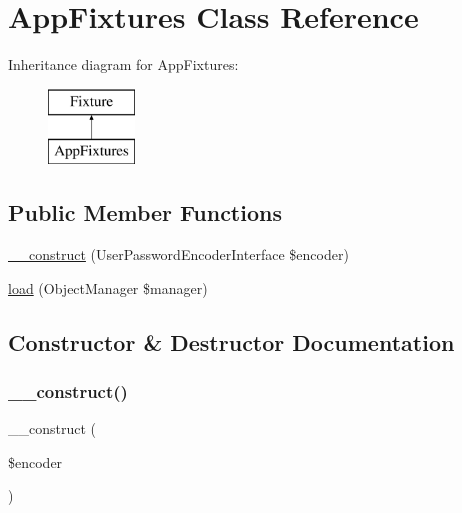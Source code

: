 \hypertarget{class_app_1_1_data_fixtures_1_1_app_fixtures}{}\section{App\+Fixtures Class Reference}
\label{class_app_1_1_data_fixtures_1_1_app_fixtures}
Inheritance diagram for App\+Fixtures\+:\begin{figure}[H]
\begin{center}
\leavevmode
\includegraphics[height=2.000000cm]{class_app_1_1_data_fixtures_1_1_app_fixtures}
\end{center}
\end{figure}
\subsection*{Public Member Functions}
\begin{DoxyCompactItemize}
\item 
\mbox{\hyperlink{class_app_1_1_data_fixtures_1_1_app_fixtures_ad2b145f3d6cc187491f7b61452daa8cf}{\+\_\+\+\_\+construct}} (User\+Password\+Encoder\+Interface \$encoder)
\item 
\mbox{\hyperlink{class_app_1_1_data_fixtures_1_1_app_fixtures_acb7929747e63056fbc9e2892615c18b2}{load}} (Object\+Manager \$manager)
\end{DoxyCompactItemize}


\subsection{Constructor \& Destructor Documentation}
\mbox{\label{class_app_1_1_data_fixtures_1_1_app_fixtures_ad2b145f3d6cc187491f7b61452daa8cf}} 
\subsubsection{\texorpdfstring{\_\_construct()}{\_\_construct()}}
{\footnotesize\ttfamily \+\_\+\+\_\+construct (\begin{DoxyParamCaption}\item[{User\+Password\+Encoder\+Interface}]{\$encoder }\end{DoxyParamCaption})}



